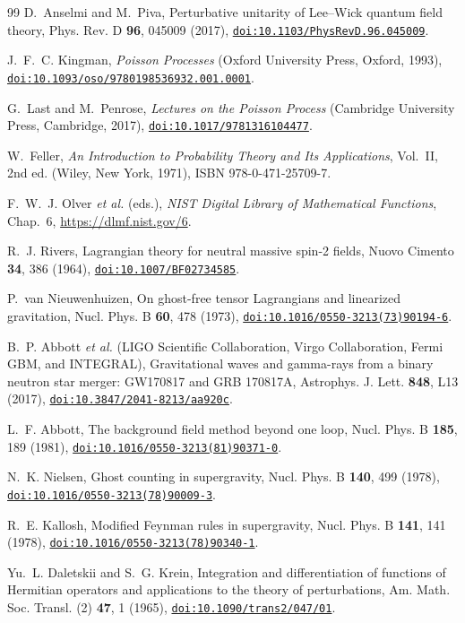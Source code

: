 \documentclass[aps,prd,10pt,twocolumn,superscriptaddress,nofootinbib,floatfix,longbibliography]{revtex4-2}
\newcommand{\doilink}[1]{\href{https://doi.org/#1}{\nolinkurl{doi:#1}}}
\begin{document}
\begin{thebibliography}{99}
D.~Anselmi and M.~Piva, Perturbative unitarity of Lee--Wick quantum field theory, Phys. Rev. D \textbf{96}, 045009 (2017), \doilink{10.1103/PhysRevD.96.045009}.

J.~F.~C. Kingman, \emph{Poisson Processes} (Oxford University Press, Oxford, 1993), \doilink{10.1093/oso/9780198536932.001.0001}.

G.~Last and M.~Penrose, \emph{Lectures on the Poisson Process} (Cambridge University Press, Cambridge, 2017), \doilink{10.1017/9781316104477}.

W.~Feller, \emph{An Introduction to Probability Theory and Its Applications}, Vol.~II, 2nd ed. (Wiley, New York, 1971), ISBN 978-0-471-25709-7.

F.~W.~J. Olver \emph{et al.} (eds.), \emph{NIST Digital Library of Mathematical Functions}, Chap.~6, \url{https://dlmf.nist.gov/6}.

R.~J. Rivers, Lagrangian theory for neutral massive spin-2 fields, Nuovo Cimento \textbf{34}, 386 (1964), \doilink{10.1007/BF02734585}.

P.~van Nieuwenhuizen, On ghost-free tensor Lagrangians and linearized gravitation, Nucl. Phys. B \textbf{60}, 478 (1973), \doilink{10.1016/0550-3213(73)90194-6}.

B.~P. Abbott \emph{et al.} (LIGO Scientific Collaboration, Virgo Collaboration, Fermi GBM, and INTEGRAL), Gravitational waves and gamma-rays from a binary neutron star merger: GW170817 and GRB 170817A, Astrophys. J. Lett. \textbf{848}, L13 (2017), \doilink{10.3847/2041-8213/aa920c}.

L.~F. Abbott, The background field method beyond one loop, Nucl. Phys. B \textbf{185}, 189 (1981), \doilink{10.1016/0550-3213(81)90371-0}.

N.~K. Nielsen, Ghost counting in supergravity, Nucl. Phys. B \textbf{140}, 499 (1978), \doilink{10.1016/0550-3213(78)90009-3}.

R.~E. Kallosh, Modified Feynman rules in supergravity, Nucl. Phys. B \textbf{141}, 141 (1978), \doilink{10.1016/0550-3213(78)90340-1}.

Yu.~L. Daletskii and S.~G. Krein, Integration and differentiation of functions of Hermitian operators and applications to the theory of perturbations, Am. Math. Soc. Transl. (2) \textbf{47}, 1 (1965), \doilink{10.1090/trans2/047/01}.


\end{thebibliography}
\end{document}
